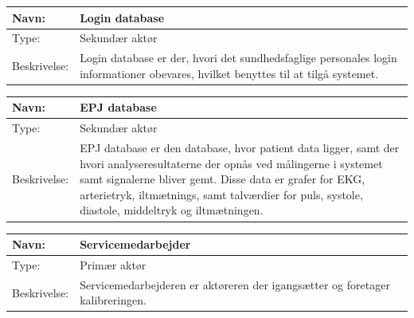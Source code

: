 \begin{table}[h!]
\begin{tabular}{| >{\raggedright\arraybackslash}p{3cm} | >{\raggedright\arraybackslash}p{12cm} |}
   \hline
   Navn: & Login database\\ \hline
   Type: & Sekundær aktør \\ \hline
   Beskrivelse: & Login database er der, hvori det sundhedsfaglige personales login informationer obevares, hvilket benyttes til at tilgå systemet. \\ \hline
\end{tabular}
\end{table}


\begin{table}[h!]
\begin{tabular}{| >{\raggedright\arraybackslash}p{3cm} | >{\raggedright\arraybackslash}p{12cm} |}
   \hline
   Navn: & EPJ database\\ \hline
   Type: & Sekundær aktør \\ \hline
   Beskrivelse: & EPJ database er den database, hvor patient data ligger, samt der hvori analyseresultaterne der opnås ved målingerne i systemet samt signalerne bliver gemt. Disse data er grafer for EKG, arterietryk, iltmætnings, samt talværdier for puls, systole, diastole, middeltryk og iltmætningen.\\ \hline
\end{tabular}
\end{table}

\begin{table}[h!]
\begin{tabular}{| >{\raggedright\arraybackslash}p{3cm} | >{\raggedright\arraybackslash}p{12cm} |}
   \hline
   Navn: & Servicemedarbejder\\ \hline
   Type: & Primær aktør \\ \hline
   Beskrivelse: & Servicemedarbejderen er aktøreren der igangsætter og foretager kalibreringen.\\ \hline
\end{tabular}
\end{table}


\newpage



